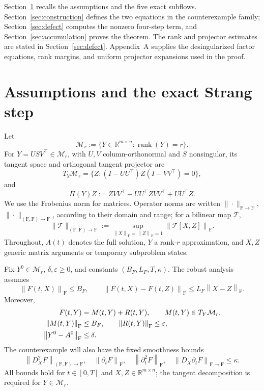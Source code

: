 \documentclass[]{article}
\numberwithin{equation}{section}
\theoremstyle{plain}
\theoremstyle{remark}
\newcommand{\R}{\mathbb{R}}
\newcommand{\Mr}{\mathcal{M}_r}
\newcommand{\F}{\mathrm F}
\newcommand{\norm}[1]{\left\lVert #1\right\rVert}
\newcommand{\eps}{\varepsilon}
\newcommand{\rank}{\operatorname{rank}}
\begin{document}
Section~\ref{sec:method} recalls the assumptions and the five exact
subflows.  Section~\ref{sec:construction} defines
the two equations in the counterexample family;
Section~\ref{sec:defect} computes
the nonzero four-step term, and Section~\ref{sec:accumulation} proves the
theorem.  The rank and projector estimates are stated in
Section~\ref{sec:defect}.  Appendix~A supplies the desingularized factor
equations, rank margins, and uniform projector expansions used in the
proof.

\section{Assumptions and the exact Strang step}
\label{sec:method}

Let
\[
 \Mr:=\{Y\in\R^{m\times n}:\rank(Y)=r\}.
\]
For $Y=USV^\top\in\Mr$, with $U,V$ column-orthonormal and $S$
nonsingular, its tangent space and orthogonal tangent projector are
\[
 T_Y\Mr=\{Z:(I-UU^\top)Z(I-VV^\top)=0\},
\]
and
\begin{equation}\label{eq:tangent-projector}
 \Pi(Y)Z:=ZVV^\top-UU^\top ZVV^\top+UU^\top Z.
\end{equation}
We use the Frobenius norm for matrices.  Operator norms are written
$\|\cdot\|_{\F\to\F}$,
$\|\cdot\|_{(\F,\F)\to\F}$, according to their domain and range; for
a bilinear map $\mathcal T$,
\[
 \|\mathcal T\|_{(\F,\F)\to\F}
 :=\sup_{\norm X_{\F}=\norm Z_{\F}=1}\norm{\mathcal T[X,Z]}_{\F}.
\]
Throughout, $A(t)$ denotes the full solution, $Y$ a rank-$r$
approximation, and $X,Z$ generic matrix arguments or temporary
subproblem states.

Fix $Y^0\in\Mr$, $\delta,\eps\ge0$, and constants
$(B_F,L_F,T,\kappa)$.  The robust analysis assumes
\begin{equation}\label{eq:basic-bounds}
 \norm{F(t,X)}_{\F}\le B_F,\qquad
 \norm{F(t,X)-F(t,Z)}_{\F}\le L_F\norm{X-Z}_{\F}.
\end{equation}
Moreover,
\begin{align}
 F(t,Y)&=M(t,Y)+R(t,Y),\qquad M(t,Y)\in T_Y\Mr,\notag\\
 \norm{M(t,Y)}_{\F}&\le B_F,\qquad \norm{R(t,Y)}_{\F}\le\eps,
 \label{eq:tangent-decomp}\\
 \norm{Y^0-A^0}_{\F}&\le\delta.
 \label{eq:remainder-initial}
\end{align}
The counterexample will also have the fixed smoothness bounds
\begin{equation}\label{eq:smooth-bounds}
 \norm{D_X^2F}_{(\F,\F)\to\F},\quad
 \norm{\partial_tF}_{\F},\quad
 \norm{\partial_t^2F}_{\F},\quad
 \norm{D_X\partial_tF}_{\F\to\F}
 \le\kappa.
\end{equation}
All bounds hold for $t\in[0,T]$ and $X,Z\in\R^{m\times n}$; the tangent
decomposition is required for $Y\in\Mr$.
\end{document}
